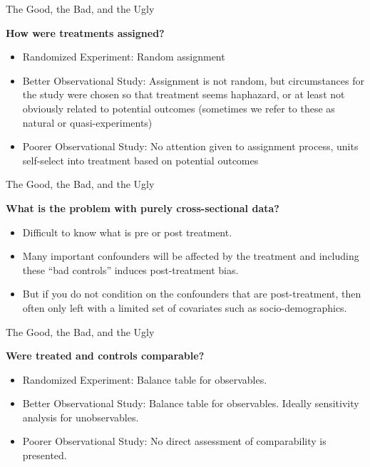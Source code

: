 \documentclass{beamer}
\numberwithin{equation}{section}
\begin{document}
\begin{frame}{The Good, the Bad, and the Ugly}

\textbf{How were treatments assigned?}

\begin{itemize}
\itemsep1pt\parskip0pt
\item
  \alert{Randomized Experiment}: Random assignment \medskip
\item
  \alert{Better Observational Study}: Assignment is not random, but
  circumstances for the study were chosen so that treatment seems
  haphazard, or at least not obviously related to potential outcomes
  (sometimes we refer to these as natural or quasi-experiments) \medskip
\item
  \alert{Poorer Observational Study}: No attention given to assignment
  process, units self-select into treatment based on potential outcomes
\end{itemize}

\end{frame}

\begin{frame}{The Good, the Bad, and the Ugly}

\textbf{What is the problem with purely cross-sectional data?}

\begin{itemize}
\itemsep1pt\parskip0pt
\item
  Difficult to know what is pre or post treatment. \medskip
\item
  Many important confounders will be affected by the treatment and including these ``bad controls'' induces post-treatment bias. \medskip
\item
  But if you do not condition on the confounders that are
  post-treatment, then often only left with a limited set of covariates
  such as socio-demographics.
\end{itemize}

\end{frame}

\begin{frame}{The Good, the Bad, and the Ugly}

\textbf{Were treated and controls comparable?}

\begin{itemize}
\itemsep1pt\parskip0pt
\item
  \alert{Randomized Experiment}: Balance table for observables. \medskip
\item
  \alert{Better Observational Study}: Balance table for observables.
  Ideally sensitivity analysis for unobservables. \medskip
\item
  \alert{Poorer Observational Study}: No direct assessment of
  comparability is presented.
\end{itemize}

\end{frame}
\end{document}

